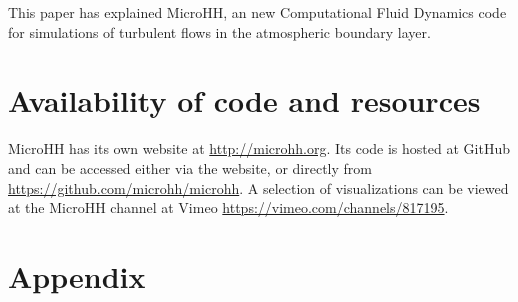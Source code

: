 \documentclass[gmd]{copernicus}
\begin{document}
\conclusions  \label{sec:conclusion} %
This paper has explained MicroHH, an new Computational Fluid Dynamics code for simulations of turbulent flows in the atmospheric boundary layer. 

\section{Availability of code and resources}
MicroHH has its own website at \url{http://microhh.org}. Its code is hosted at GitHub and can be accessed either via the website, or directly from 
\url{https://github.com/microhh/microhh}. A selection of visualizations can be viewed at the MicroHH channel at Vimeo \url{https://vimeo.com/channels/817195}.


\section{Appendix}
\end{document}
